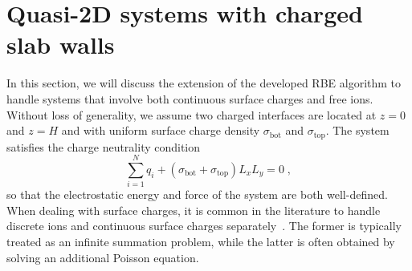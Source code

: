 \section{Quasi-2D systems with charged slab walls}\label{app::surfacecharge}

In this section, we will discuss the extension of the developed RBE algorithm to handle systems that involve both continuous surface charges and free ions. Without loss of generality, we assume two charged interfaces are located at $z=0$ and $z=H$ and with uniform surface charge density $\sigma_{\text{bot}}$ and $\sigma_{\text{top}}$. The system satisfies the charge neutrality condition \begin{equation}\label{eq::chargeneutrality}
    \sum_{i=1}^N q_i+(\sigma_{\text{bot}}+\sigma_{\text{top}})L_xL_y=0\;,
\end{equation}
so that the electrostatic energy and force of the system are both well-defined. When dealing with surface charges, it is common in the literature to handle discrete ions and continuous surface charges separately~\cite{spohr1997effect,yi2017note,yuan2021particle}. The former is typically treated as an infinite summation problem, while the latter is often obtained by solving an additional Poisson equation. %


